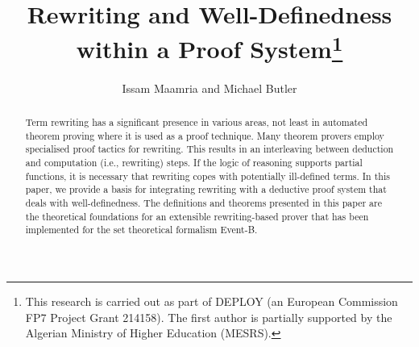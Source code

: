 \documentclass[copyright]{eptcs}
\title{Rewriting and Well-Definedness within a Proof System\thanks{This research is carried out as part of DEPLOY (an European Commission FP7 Project Grant 214158). The first author is partially supported by the Algerian Ministry of Higher Education (MESRS).}}
\author{Issam Maamria and Michael Butler
\email{\{im06r,mjb\}@ecs.soton.ac.uk}
\institute{Electronics and Computer Science\\}
\institute{University of Southampton\\ Southampton, UK}
}
\begin{document}
\maketitle
\begin{abstract}
Term rewriting has a significant presence in various areas, not least in automated theorem proving where it is used as a proof technique. Many theorem provers employ specialised proof tactics for rewriting. This results in an interleaving between deduction and computation (i.e., rewriting) steps. If the logic of reasoning supports partial functions, it is necessary that rewriting copes with potentially ill-defined terms. In this paper, we provide a basis for integrating rewriting with a deductive proof system that deals with well-definedness. The definitions and theorems presented in this paper are the theoretical foundations for an extensible rewriting-based prover that has been implemented for the set theoretical formalism Event-B.
\end{abstract}
\end{document}
